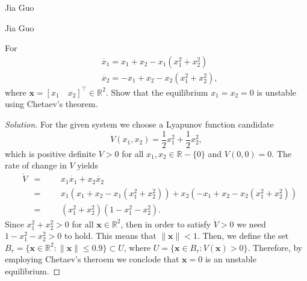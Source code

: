 \documentclass[12pt]{article}
\newenvironment{problem}[2][Problem]{\begin{trivlist}
\item[\hskip \labelsep {\bfseries #1}\hskip \labelsep {\bfseries #2.}]}{\end{trivlist}}
\newenvironment{solution}{\begin{proof}[Solution]}{\end{proof}}
\begin{document}
\begin{problem}{2} %
Jia Guo
\end{problem}


\begin{problem}{3} %
Jia Guo
\end{problem}


\begin{problem}{4} %
For
\begin{align*}
&\dot{x_1}=x_1+x_2-x_1(x_1^2+x_2^2) \\
&\dot{x_2}=-x_1+x_2-x_2(x_1^2+x_2^2),
\end{align*}
where $\textbf{x}=[x_1 \quad x_2]^\top \in \mathbb{R}^2$. Show that the equilibrium $x_1=x_2=0$ is unstable using Chetaev's theorem.
\end{problem}
\begin{solution}
For the given system we choose a Lyapunov function candidate
\begin{equation*}
V(x_1,x_2)=\frac{1}{2}x_1^2+\frac{1}{2}x_2^2,
\end{equation*}
which is positive definite $V>0$ for all $x_1,x_2 \in \mathbb{R}-\{0 \}$ and $V(0,0)=0$. The rate of change in $V$ yields
\begin{equation*}
\begin{aligned}
& \dot{V}
&  =
&&& x_1\dot{x_1}+x_2\dot{x_2}\\
&& =
&&& x_1(x_1+x_2-x_1(x_1^2+x_2^2))+x_2(-x_1+x_2-x_2(x_1^2+x_2^2))\\
&& =
&&& (x_1^2+x_2^2)(1-x_1^2-x_2^2).
\end{aligned}
\end{equation*}
Since $x_1^2+x_2^2>0$ for all $\textbf{x}\in  \mathbb{R}^2$, then in order to satisfy $\dot{V}>0$ we need $1-x_1^2-x_2^2>0$ to hold. This means that $\| \textbf{x}\| <1$. Then, we define the set $B_r=\{ \textbf{x}\in \mathbb{R}^2:\| \textbf{x}\| \leq 0.9 \}\subset U$, where $U=\{\textbf{x}\in B_r : V(\textbf{x})>0 \}$. Therefore, by employing Chetaev's theroem we conclode that $\textbf{x}=0 $ is an unstable equilibrium.
\end{solution}
\end{document}
